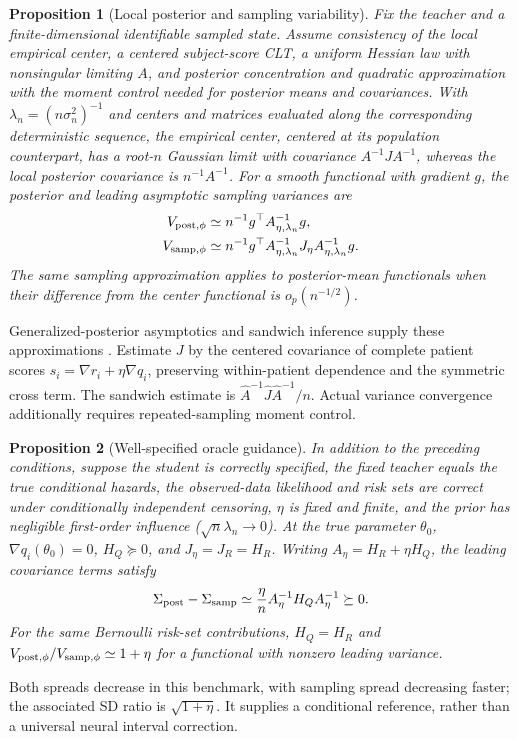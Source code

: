 \documentclass{article} %
\newtheorem{proposition}{Proposition}
\begin{document}
\begin{proposition}[Local posterior and sampling variability]
\label{prop:local-spread-main}
Fix the teacher and a finite-dimensional identifiable sampled state. Assume consistency of the local empirical center, a centered subject-score CLT, a uniform Hessian law with nonsingular limiting $A$, and posterior concentration and quadratic approximation with the moment control needed for posterior means and covariances. With $\lambda_n=(n\sigma_n^2)^{-1}$ and centers and matrices evaluated along the corresponding deterministic sequence,
the empirical center, centered at its population counterpart, has a root-$n$ Gaussian limit with covariance $A^{-1}JA^{-1}$, whereas the local posterior covariance is $n^{-1}A^{-1}$.
For a smooth functional with gradient $g$, the posterior and leading asymptotic sampling variances are
\begin{equation}
\begin{aligned}
V_{{\rm post},\phi}&\simeq n^{-1}g^\top A_{\eta,\lambda_n}^{-1}g,\\
V_{{\rm samp},\phi}&\simeq n^{-1}g^\top A_{\eta,\lambda_n}^{-1}J_\eta A_{\eta,\lambda_n}^{-1}g.
\end{aligned}
\label{eq:functional-spreads}
\end{equation}
The same sampling approximation applies to posterior-mean functionals when their difference from the center functional is $o_p(n^{-1/2})$.
\end{proposition}
Generalized-posterior asymptotics and sandwich inference supply these approximations \citep{miller2021,shaby2014}. Estimate $J$ by the centered covariance of complete patient scores $s_i=\nabla r_i+\eta\nabla q_i$, preserving within-patient dependence and the symmetric cross term. The sandwich estimate is $\widehat A^{-1}\widehat J\widehat A^{-1}/n$. Actual variance convergence additionally requires repeated-sampling moment control.

\begin{proposition}[Well-specified oracle guidance]
\label{prop:oracle-spread}
In addition to the preceding conditions, suppose the student is correctly specified, the fixed teacher equals the true conditional hazards, the observed-data likelihood and risk sets are correct under conditionally independent censoring, $\eta$ is fixed and finite, and the prior has negligible first-order influence ($\sqrt n\lambda_n\to0$). At the true parameter $\theta_0$, $\nabla q_i(\theta_0)=0$, $H_Q\succeq0$, and $J_\eta=J_R=H_R$. Writing $A_\eta=H_R+\eta H_Q$, the leading covariance terms satisfy
\begin{equation}
\Sigma_{\rm post}-\Sigma_{\rm samp}\simeq\frac{\eta}{n}A_\eta^{-1}H_QA_\eta^{-1}\succeq0.
\label{eq:oracle-spread-gap}
\end{equation}
For the same Bernoulli risk-set contributions, $H_Q=H_R$ and $V_{{\rm post},\phi}/V_{{\rm samp},\phi}\simeq1+\eta$ for a functional with nonzero leading variance.
\end{proposition}
Both spreads decrease in this benchmark, with sampling spread decreasing faster; the associated SD ratio is $\sqrt{1+\eta}$. It supplies a conditional reference, rather than a universal neural interval correction.
\end{document}
